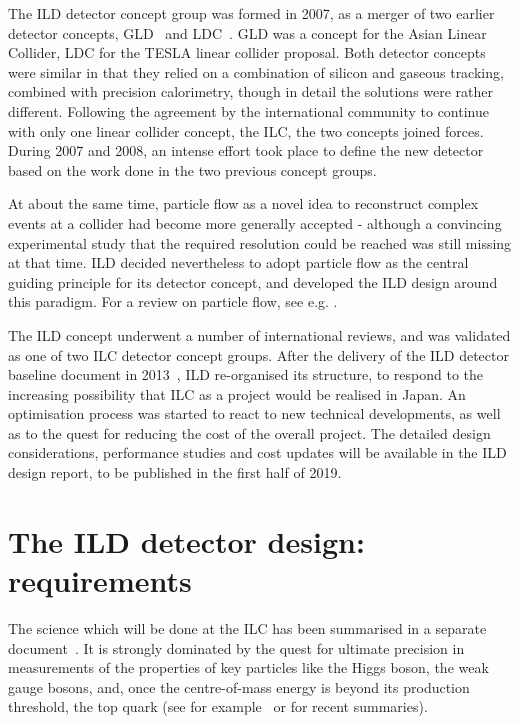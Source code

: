 \documentclass[%
 amsmath,amssymb,
 aps,
 longbibliography,
]{revtex4-1}
\begin{document}
The ILD detector concept group was formed in 2007, as a merger of two earlier detector concepts, GLD~\cite{ild:bib:ref-gld} and LDC~\cite{ild:bib:ref-ldc}. GLD was a concept for the Asian Linear Collider, LDC for the TESLA linear collider proposal. Both detector concepts were similar in that they relied on a combination of silicon and gaseous tracking, combined with precision calorimetry, though in detail the solutions were rather different. Following the agreement by the international community to continue with only one linear collider concept, the ILC, the two concepts joined forces. During 2007 and 2008, an intense effort took place to define the new detector based on the work done in the two previous concept groups. 

At about the same time, particle flow as a novel idea to reconstruct complex events at a collider had become more generally accepted - although a convincing experimental study that the required resolution could be reached was still missing at that time. ILD decided nevertheless to adopt particle flow as the central guiding principle for its detector concept, and developed the ILD design around this paradigm. For a review on particle flow, see e.g. \cite{ild:bib:PandoraPFA}.

The ILD concept underwent a number of international reviews, and was validated as one of two ILC detector concept groups. After the delivery of the ILD detector baseline document in 2013~\cite{Behnke:2013lya}, ILD re-organised its structure, to respond to the increasing possibility that ILC as a project would be realised in Japan. An optimisation process was started to react to new technical developments, as well as to the quest for reducing the cost of the overall project. The detailed design considerations, performance studies and cost updates will be available in the ILD design report, to be published in the first half of 2019. 

\section{The ILD detector design: requirements}
The science which will be done at the ILC has been summarised in a separate document~\cite{ILCESU1}. It is strongly dominated by the quest for ultimate precision in measurements of the properties of key particles like the Higgs boson, the weak gauge bosons, and, once the centre-of-mass energy is beyond its production threshold, the top quark (see for example~\cite{Fujii:2017vwa} or \cite{ILCESU1} for recent summaries). 
\end{document}
